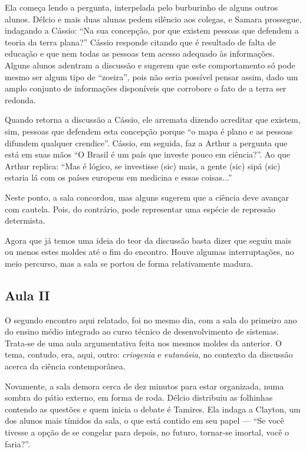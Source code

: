 \documentclass[12pt,a4paper]{article}
\begin{document}
    Ela começa lendo a pergunta, interpelada pelo burburinho de alguns 
    outros alunos. Délcio e mais duas alunas pedem silêncio aos colegas, e 
    Samara prossegue, indagando a Cássio: ``Na sua concepção, por que existem 
    pessoas que defendem a teoria da terra plana?'' Cássio responde citando 
    que é resultado de falta de educação e que nem todas as pessoas tem acesso 
    adequado às informações. Alguns alunos adentram a discussão e sugerem que 
    este comportamento só pode mesmo ser algum tipo de ``zoeira'', pois não 
    seria possível pensar assim, dado um amplo conjunto de informações 
    disponíveis que corrobore o fato de a terra ser redonda. 
    
    Quando retorna a discussão a Cássio, ele arremata dizendo acreditar que 
    existem, sim, pessoas que defendem esta concepção porque ``o mapa é plano 
    e as pessoas difundem qualquer crendice''. Cássio, em seguida, faz a 
    Arthur a pergunta que está em suas mãos ``O Brasil é um país que 
    investe pouco em ciência?''. Ao que Arthur replica: ``Mas é lógico, 
    se investisse (sic) mais, a gente (sic) sipá (sic) estaria lá com os 
    países europeus em medicina e essas coisas...'' 
    
    Neste ponto, a sala concordou, mas alguns sugerem que a ciência deve 
    avançar com cautela. Pois, do contrário, pode representar uma espécie de 
    repressão determista. 
    
    Agora que já temos uma ideia do teor da discussão basta dizer que seguiu 
    mais ou menos estes moldes até o fim do encontro. Houve algumas 
    interruptações, no meio percurso, mas a sala se portou de forma 
    relativamente madura. 

    \subsection*{Aula II}
    
    O segundo encontro aqui relatado, foi no mesmo dia, com a sala do primeiro 
    ano do ensino médio integrado ao curso técnico de desenvolvimento de 
    sistemas. Trata-se de uma aula argumentativa feita nos mesmos moldes da 
    anterior. O tema, contudo, era, aqui, outro: \textit{criogenia} e 
    \textit{eutanásia}, no contexto da discussão acerca da ciência 
    contemporânea. 
    
    Novamente, a sala demora cerca de dez minutos para estar organizada, 
    numa sombra do pátio externo, em forma de roda. Délcio distribuiu as 
    folhinhas contendo as questões e quem inicia o debate é Tamires. Ela indaga 
    a Clayton, um dos alunos mais tímidos da sala, o que está contido em seu 
    papel --- ``Se você tivesse a opção de se congelar para depois, no futuro,  
    tornar-se imortal, você o faria?''. 
    
\end{document}

